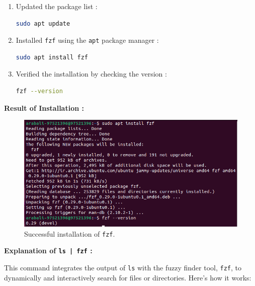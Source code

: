 \documentclass[12pt]{article}
\begin{document}
            \begin{enumerate}
                \item Updated the package list :
                \begin{lstlisting}[language=bash]
                sudo apt update
                \end{lstlisting}

                \item Installed \texttt{fzf} using the \texttt{apt} package manager :
                \begin{lstlisting}[language=bash]
                sudo apt install fzf
                \end{lstlisting}

                \item Verified the installation by checking the version :
                \begin{lstlisting}[language=bash]
                fzf --version
                \end{lstlisting}
            \end{enumerate}

            \textbf{Result of Installation :}

            \begin{figure}[H]
                \centering
                \includegraphics[width=\textwidth]{assets/pictures/installation_of_fzf.png}
                \caption{Successful installation of \texttt{fzf}.}
            \end{figure}
            
            \textbf{Explanation of \texttt{ls | fzf} :}

            This command integrates the output of \texttt{ls} with the fuzzy finder tool, \texttt{fzf}, to dynamically and interactively search for files or directories. Here's how it works:
\end{document}
